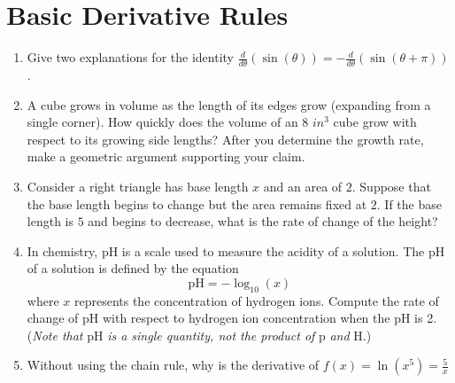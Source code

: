 \documentclass[12pt]{report}
\begin{document}
\newcommand{\less}{\textless}
\newcommand{\greater}{\textgreater}
\newcommand{\reals}{\mathbb{R}}
\newcommand{\integers}{\mathbb{Z}}
\newcommand{\rationals}{\mathbb{Q}}
\newcommand{\dsp}{\displaystyle}


\section*{Basic Derivative Rules}

\begin{enumerate}

\item Give two explanations for the identity $\frac{d}{d\theta}(\sin(\theta))=-\frac{d}{d\theta}(\sin(\theta+\pi))$. 

\item A cube grows in volume as the length of its edges grow (expanding from a single corner). How quickly does the volume of an $8$ $in^3$ cube grow with respect to its growing side lengths? After you determine the growth rate, make a geometric argument supporting your claim. 

\item Consider a right triangle has base length $x$ and an area of $2$. Suppose that the base length begins to change but the area remains fixed at $2$. If the base length is $5$ and begins to decrease, what is the rate of change of the height?

\item In chemistry, pH is a scale used to measure the acidity of a solution. The pH of a solution is defined by the equation
\[
\text{pH} = -\log_{10}(x)
\] 
where $x$ represents the concentration of hydrogen ions. Compute the rate of change of pH with respect to hydrogen ion concentration when the pH is 2. (\textit{Note that} pH \textit{is a single quantity, not the product of} p \textit{and} H.)

\item Without using the chain rule, why is the derivative of $f(x)=\ln(x^5)=\frac{5}{x}$


\end{enumerate}
\end{document}
